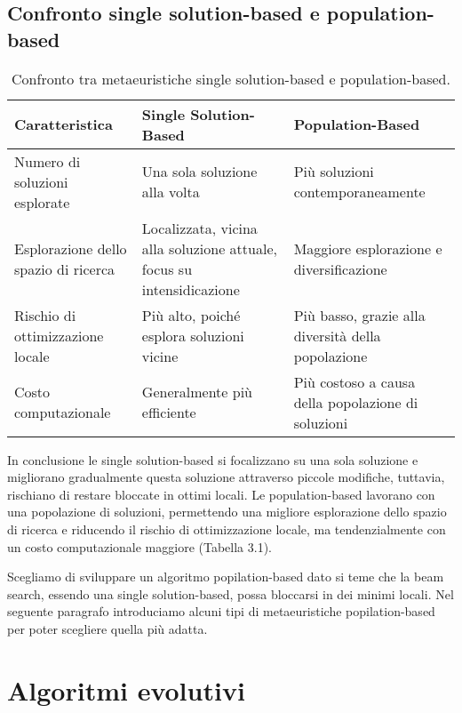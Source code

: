 \subsection{Confronto single solution-based e population-based}

\begin{table}[!ht]
    \centering
    \renewcommand{\arraystretch}{1.7}
    \begin{tabular}{|>{\raggedright\arraybackslash}p{4cm}|>{\raggedright\arraybackslash}p{4cm}|>{\raggedright\arraybackslash}p{4cm}|}
    \hline
    \textbf{Caratteristica} & \textbf{Single Solution-Based} & \textbf{Population-Based} \\ \hline
    Numero di soluzioni esplorate & Una sola soluzione alla volta & Più soluzioni contemporaneamente \\ \hline
    Esplorazione dello spazio di ricerca & Localizzata, vicina alla soluzione attuale, focus su intensidicazione & Maggiore esplorazione e diversificazione \\ \hline
    Rischio di ottimizzazione locale & Più alto, poiché esplora soluzioni vicine & Più basso, grazie alla diversità della popolazione \\ \hline
    Costo computazionale & Generalmente più efficiente & Più costoso a causa della popolazione di soluzioni \\ \hline
    \end{tabular}
    \caption{Confronto tra metaeuristiche single solution-based e population-based.}
    \label{tab:comparison}
\end{table}

In conclusione le single solution-based si focalizzano su una sola soluzione e migliorano gradualmente questa soluzione attraverso piccole modifiche, tuttavia, rischiano di restare bloccate in ottimi locali. Le population-based lavorano con una popolazione di soluzioni, permettendo una migliore esplorazione dello spazio di ricerca e riducendo il rischio di ottimizzazione locale, ma tendenzialmente con un costo computazionale maggiore (Tabella 3.1).

Scegliamo di sviluppare un algoritmo popilation-based dato si teme che la beam search, essendo una single solution-based, possa bloccarsi in dei minimi locali. Nel seguente paragrafo introduciamo alcuni tipi di metaeuristiche popilation-based per poter scegliere quella più adatta.

\section{Algoritmi evolutivi}

